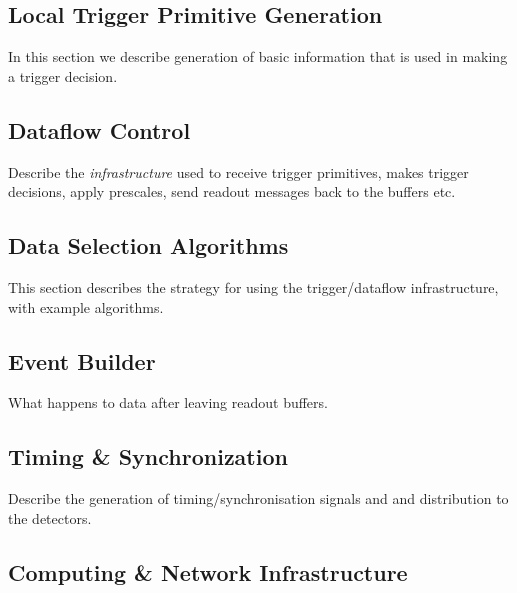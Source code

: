 \subsection{Local Trigger Primitive Generation}
\label{sec:fdsp-daq-ltr}

In this section we describe generation of basic information that is used in making a trigger decision.

\subsection{Dataflow Control}
\label{sec:fdsp-daq-hlt}

Describe the {\it infrastructure} used to receive trigger primitives, makes trigger decisions, apply prescales, send readout messages back to the buffers etc.

\subsection{Data Selection Algorithms}
\label{sec:fdsp-daq-hlt}

This section describes the strategy for using the trigger/dataflow infrastructure, with example algorithms.

\subsection{Event Builder}
\label{sec:fdsp-daq-eb}

What happens to data after leaving readout buffers.

%
%
%

\subsection{Timing \& Synchronization}
\label{sec:fdsp-daq-hlt}

Describe the generation of timing/synchronisation signals and and distribution to the detectors.


\subsection{Computing \& Network Infrastructure}
\label{sec:fdsp-daq-infra}

